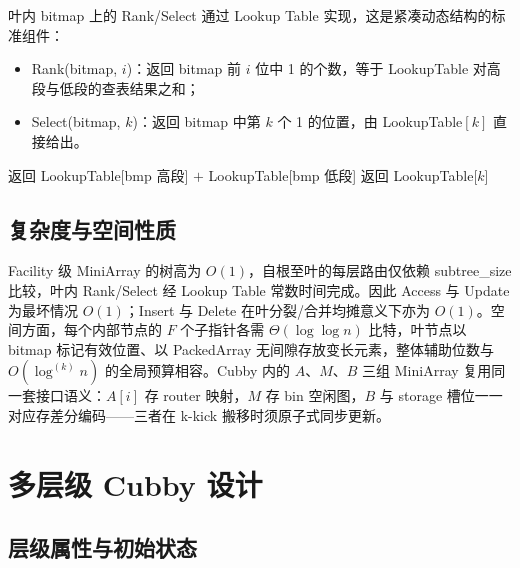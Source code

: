 叶内 bitmap 上的 Rank/Select 通过 Lookup Table 实现，这是紧凑动态结构的标准组件\cite{jacobson1989,pagh2008retrieval,bender2022otsh,lehmann2026mphsurvey}：
\begin{itemize}
  \item Rank(bitmap, \(i\))：返回 bitmap 前 \(i\) 位中 1 的个数，等于 LookupTable 对高段与低段的查表结果之和；
  \item Select(bitmap, \(k\))：返回 bitmap 中第 \(k\) 个 1 的位置，由 LookupTable\([k]\) 直接给出。
\end{itemize}

\begin{algorithm}[htbp]
  \caption{Rank / Select（查表实现）}
  \label{alg:rank-select}
  \begin{algorithmic}[1]
      \State 返回 LookupTable[bmp 高段] $+$ LookupTable[bmp 低段]
    \EndFunction
      \State 返回 LookupTable[$k$] 
    \EndFunction
  \end{algorithmic}
\end{algorithm}

\subsection{复杂度与空间性质}

Facility 级 MiniArray 的树高为 \(O(1)\)，自根至叶的每层路由仅依赖 subtree\_size 比较，叶内 Rank/Select 经 Lookup Table 常数时间完成\cite{jacobson1989,pagh2008retrieval}。因此 Access 与 Update 为最坏情况 \(O(1)\)；Insert 与 Delete 在叶分裂/合并均摊意义下亦为 \(O(1)\)\cite{bayer1972,bender2022otsh}。空间方面，每个内部节点的 \(F\) 个子指针各需 \(\Theta(\log\log n)\) 比特，叶节点以 bitmap 标记有效位置、以 PackedArray 无间隙存放变长元素，整体辅助位数与 \(O(\log^{(k)}n)\) 的全局预算相容\cite{kurpicz2023pachash,lehmann2024shockhash}。Cubby 内的 \(A\)、\(M\)、\(B\) 三组 MiniArray 复用同一套接口语义：\(A[i]\) 存 router 映射，\(M\) 存 bin 空闲图，\(B\) 与 storage 槽位一一对应存差分编码——三者在 k-kick 搬移时须原子式同步更新。

\section{多层级 Cubby 设计}

\subsection{层级属性与初始状态}

